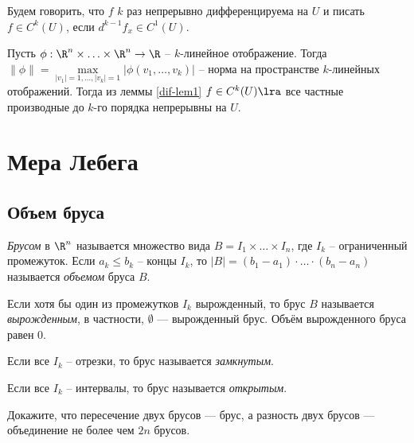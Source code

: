 \begin{definition}
    Будем говорить, что $f$ $k$ раз непрерывно дифференцируема на $U$ и писать $f \in C^{k}(U)$, если $d^{k - 1}f_{x} \in C^{1}(U)$.
\end{definition}

\begin{note}
    Пусть $\phi: \R^{n} \times \ldots \times \R^{n} \to \R$ -- $k$-линейное отображение. Тогда $\|\phi\|=\underset{|v_{1}| = 1, \ldots, |v_{k}| = 1}{\max}|\phi(v_{1}, \ldots, v_{k})|$ -- норма на пространстве $k$-линейных отображений. Тогда из леммы \ref{dif-lem1} $f \in C^{k}(U) \lra $ все частные производные до $k$-го порядка непрерывны на $U$.
\end{note}

\section{Мера Лебега}

\subsection{Объем бруса}

\begin{definition}
    \textit{Брусом} в $\R^{n}$ называется множество вида $B = I_{1} \times \ldots \times I_{n}$, где $I_{k}$ -- ограниченный промежуток. Если $a_{k} \leq b_{k}$ -- концы $I_{k}$, то $|B| = (b_{1} - a_{1})\cdot \ldots \cdot(b_{n} - a_{n})$ называется \textit{объемом} бруса $B$.

    Если хотя бы один из промежутков $I_k$ вырожденный, то брус $B$ называется \emph{вырожденным}, в частности, $\emptyset$ --- вырожденный брус. Объём вырожденного бруса равен 0.

    Если все $I_{k}$ -- отрезки, то брус называется \textit{замкнутым}.
    
    Если все $I_{k}$ -- интервалы, то брус называется \textit{открытым}.

\end{definition}

\begin{problem}
    Докажите, что пересечение двух брусов --- брус, а разность двух брусов --- объединение не более чем $2n$ брусов.
\end{problem}

